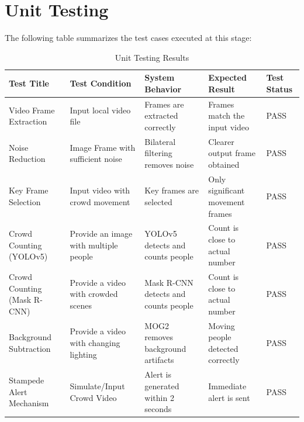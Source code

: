 \documentclass[11pt]{report}
\begin{document}
\section{Unit Testing}
The following table summarizes the test cases executed at this stage:
\begin{table}[H]
    \centering
    \renewcommand{\arraystretch}{1.4}
    \setlength{\tabcolsep}{3pt}
    \footnotesize
    \begin{tabular}{| m{2.3cm} | m{3.2cm} | m{3.5cm} | m{3.2cm} | m{1.2cm} |}
        \hline
        \textbf{Test Title} & \textbf{Test Condition} & \textbf{System Behavior} & \textbf{Expected Result} & \textbf{Test Status} \\ 
         \hline
         Video Frame Extraction & Input local video file & Frames are extracted correctly & Frames match the input video & PASS \\
        \hline 
        Noise Reduction & Image Frame with sufficient noise & Bilateral filtering removes noise & Clearer output frame obtained & PASS \\
        \hline
        Key Frame Selection & Input video with crowd movement & Key frames are selected	& Only significant movement frames & PASS \\
        \hline
        Crowd Counting (YOLOv5) &	Provide an image with multiple people & YOLOv5 detects and counts people & Count is close to actual number & PASS \\
        \hline 
        Crowd Counting (Mask R-CNN) &	Provide a video with crowded scenes	& Mask R-CNN detects and counts people & Count is close to actual number & PASS \\
        \hline
        Background Subtraction& Provide a video with changing lighting & MOG2 removes background artifacts &	Moving people detected correctly	& PASS \\
        \hline
         Stampede Alert Mechanism  & Simulate/Input Crowd Video & Alert is generated within 2 seconds & Immediate alert is sent & PASS \\ \hline
    \end{tabular}
    \caption{Unit Testing Results}
\end{table}
\end{document}
